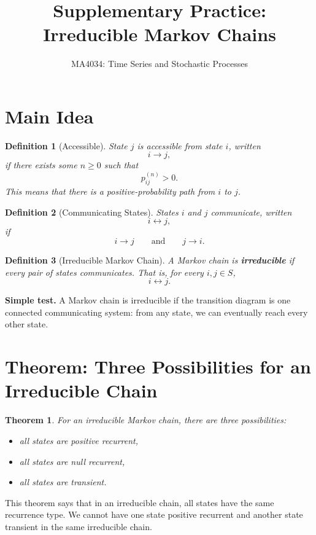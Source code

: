 \documentclass[12pt,a4paper]{article}
\title{\textbf{Supplementary Practice: Irreducible Markov Chains}}
\author{MA4034: Time Series and Stochastic Processes}
\date{}
\theoremstyle{notestyle}
\newtheorem{definition}{Definition}
\newtheorem{theorem}{Theorem}
\begin{document}
\maketitle

\section{Main Idea}

\begin{definition}[Accessible]
State $j$ is accessible from state $i$, written
\[
i\to j,
\]
if there exists some $n\geq 0$ such that
\[
p_{ij}^{(n)}>0.
\]
This means that there is a positive-probability path from $i$ to $j$.
\end{definition}

\begin{definition}[Communicating States]
States $i$ and $j$ communicate, written
\[
i\leftrightarrow j,
\]
if
\[
i\to j
\qquad\text{and}\qquad
j\to i.
\]
\end{definition}

\begin{definition}[Irreducible Markov Chain]
A Markov chain is \textbf{irreducible} if every pair of states communicates. That is, for every $i,j\in S$,
\[
i\leftrightarrow j.
\]
\end{definition}

\textbf{Simple test.} A Markov chain is irreducible if the transition diagram is one connected communicating system: from any state, we can eventually reach every other state.

\section{Theorem: Three Possibilities for an Irreducible Chain}

\begin{theorem}
For an irreducible Markov chain, there are three possibilities:
\begin{itemize}[leftmargin=1.2cm]
    \item all states are positive recurrent,
    \item all states are null recurrent,
    \item all states are transient.
\end{itemize}
\end{theorem}

This theorem says that in an irreducible chain, all states have the same recurrence type. We cannot have one state positive recurrent and another state transient in the same irreducible chain.
\end{document}
